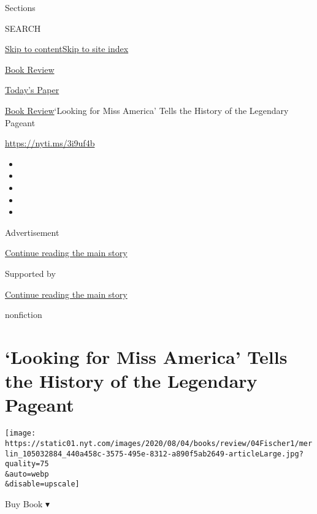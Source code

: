 Sections

SEARCH

\protect\hyperlink{site-content}{Skip to
content}\protect\hyperlink{site-index}{Skip to site index}

\href{https://www.nytimes.com/section/books/review}{Book Review}

\href{https://myaccount.nytimes.com/auth/login?response_type=cookie\&client_id=vi}{}

\href{https://www.nytimes.com/section/todayspaper}{Today's Paper}

\href{/section/books/review}{Book Review}\textbar{}`Looking for Miss
America' Tells the History of the Legendary Pageant

\url{https://nyti.ms/3i9uf4b}

\begin{itemize}
\item
\item
\item
\item
\item
\end{itemize}

Advertisement

\protect\hyperlink{after-top}{Continue reading the main story}

Supported by

\protect\hyperlink{after-sponsor}{Continue reading the main story}

nonfiction

\hypertarget{looking-for-miss-america-tells-the-history-of-the-legendary-pageant}{%
\section{`Looking for Miss America' Tells the History of the Legendary
Pageant}\label{looking-for-miss-america-tells-the-history-of-the-legendary-pageant}}

\texttt{[image: https://static01.nyt.com/images/2020/08/04/books/review/04Fischer1/merlin\_105032884\_440a458c-3575-495e-8312-a890f5ab2649-articleLarge.jpg?quality=75\\\&auto=webp\\\&disable=upscale]}

Buy Book ▾


